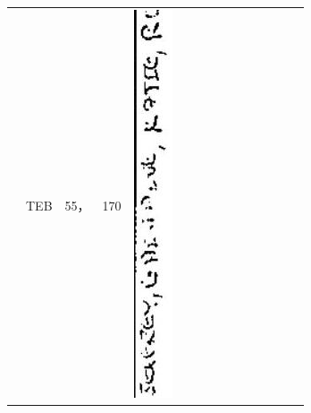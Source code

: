 \documentclass[10pt]{article}
\begin{document}
\begin{center}
\begin{tabular}{|c|c|c|c|c|c|c|c|c|c|c|c|c|c|c|}
 & TEB & 55， & 170 & \includegraphics[max width=\textwidth]{2025_02_27_dd68c3d38de88f0516d9g-009(2)}

\end{tabular}
\end{center}
\end{document}
